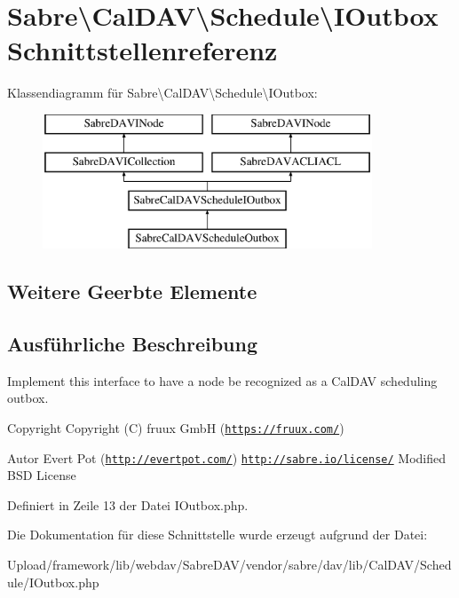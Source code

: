 \hypertarget{interface_sabre_1_1_cal_d_a_v_1_1_schedule_1_1_i_outbox}{}\section{Sabre\textbackslash{}Cal\+D\+AV\textbackslash{}Schedule\textbackslash{}I\+Outbox Schnittstellenreferenz}
\label{interface_sabre_1_1_cal_d_a_v_1_1_schedule_1_1_i_outbox}
Klassendiagramm für Sabre\textbackslash{}Cal\+D\+AV\textbackslash{}Schedule\textbackslash{}I\+Outbox\+:\begin{figure}[H]
\begin{center}
\leavevmode
\includegraphics[height=4.000000cm]{interface_sabre_1_1_cal_d_a_v_1_1_schedule_1_1_i_outbox}
\end{center}
\end{figure}
\subsection*{Weitere Geerbte Elemente}


\subsection{Ausführliche Beschreibung}
Implement this interface to have a node be recognized as a Cal\+D\+AV scheduling outbox.

\begin{DoxyCopyright}{Copyright}
Copyright (C) fruux GmbH (\href{https://fruux.com/}{\tt https\+://fruux.\+com/}) 
\end{DoxyCopyright}
\begin{DoxyAuthor}{Autor}
Evert Pot (\href{http://evertpot.com/}{\tt http\+://evertpot.\+com/})  \href{http://sabre.io/license/}{\tt http\+://sabre.\+io/license/} Modified B\+SD License 
\end{DoxyAuthor}


Definiert in Zeile 13 der Datei I\+Outbox.\+php.



Die Dokumentation für diese Schnittstelle wurde erzeugt aufgrund der Datei\+:\begin{DoxyCompactItemize}
\item 
Upload/framework/lib/webdav/\+Sabre\+D\+A\+V/vendor/sabre/dav/lib/\+Cal\+D\+A\+V/\+Schedule/I\+Outbox.\+php\end{DoxyCompactItemize}
